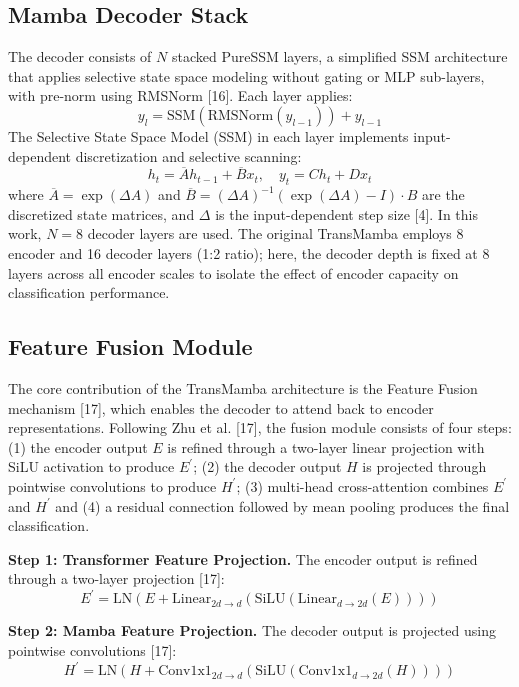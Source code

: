 \documentclass[runningheads]{llncs}
\begin{document}
\subsection{Mamba Decoder Stack}
The decoder consists of $N$ stacked PureSSM layers, a simplified SSM architecture that applies selective state space modeling without gating or MLP sub-layers, with pre-norm using RMSNorm [16]. Each layer applies:
\begin{equation}
y_l = \text{SSM}(\text{RMSNorm}(y_{l-1})) + y_{l-1}
\end{equation}
The Selective State Space Model (SSM) in each layer implements input-dependent discretization and selective scanning:
\begin{equation}
h_{t}=\overline{A}h_{t-1}+\overline{B}x_{t}, \quad y_{t}=Ch_{t}+Dx_{t}
\end{equation}
where $\overline{A}=\exp(\Delta A)$ and $\overline{B}=(\Delta A)^{-1}(\exp(\Delta A)-I)\cdot B$ are the discretized state matrices, and $\Delta$ is the input-dependent step size [4]. In this work, $N=8$ decoder layers are used. The original TransMamba employs 8 encoder and 16 decoder layers (1:2 ratio); here, the decoder depth is fixed at 8 layers across all encoder scales to isolate the effect of encoder capacity on classification performance.

\subsection{Feature Fusion Module}
The core contribution of the TransMamba architecture is the Feature Fusion mechanism [17], which enables the decoder to attend back to encoder representations. Following Zhu et al. [17], the fusion module consists of four steps: (1) the encoder output $E$ is refined through a two-layer linear projection with SiLU activation to produce $E^{\prime}$; (2) the decoder output $H$ is projected through pointwise convolutions to produce $H^{\prime}$; (3) multi-head cross-attention combines $E^{\prime}$ and $H^{\prime}$ and (4) a residual connection followed by mean pooling produces the final classification.

\noindent\textbf{Step 1: Transformer Feature Projection.} The encoder output is refined through a two-layer projection [17]:
\begin{equation}
E^{\prime}=\text{LN}(E+\text{Linear}_{2d\rightarrow d}(\text{SiLU}(\text{Linear}_{d\rightarrow2d}(E))))
\end{equation}

\noindent\textbf{Step 2: Mamba Feature Projection.} The decoder output is projected using pointwise convolutions [17]:
\begin{equation}
H^{\prime}=\text{LN}(H+\text{Conv1x1}_{2d\rightarrow d}(\text{SiLU}(\text{Conv1x1}_{d\rightarrow2d}(H))))
\end{equation}
\end{document}
